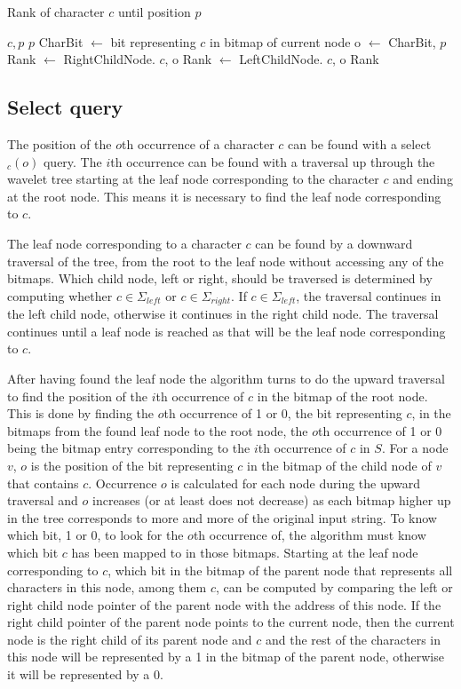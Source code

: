 \begin{algorithm}
\caption{Rank of character $c$ until position $p$}
\label{alg:rank}
\begin{algorithmic} 
 {$c, p$}
\State \Return $p$
\EndIf
\State CharBit $\gets$ bit representing $c$ in bitmap of current node
\State o $\gets$  {CharBit, $p$}
	\State Rank $\gets$ RightChildNode. {$c$, o}
\Else
	\State Rank $\gets$ LeftChildNode. {$c$, o}
\EndIf
\State \Return Rank
\EndFunction
\end{algorithmic}
\end{algorithm}


\subsection{Select query}
\label{sec:selectDescription}
The position of the $o$th occurrence of a character $c$ can be found with a select$_c(o)$ query.
The $i$th occurrence can be found with a traversal up through the wavelet tree starting at the leaf node corresponding to the character $c$ and ending at the root node.
This means it is necessary to find the leaf node corresponding to $c$.

The leaf node corresponding to a character $c$ can be found by a downward traversal of the tree, from the root to the leaf node without accessing any of the bitmaps.
Which child node, left or right, should be traversed is determined by computing whether $c \in \Sigma_{\mathit{left}}$ or $c \in \Sigma_{\mathit{right}}$.
If $c \in \Sigma_{\mathit{left}}$, the traversal continues in the left child node, otherwise it continues in the right child node.
The traversal continues until a leaf node is reached as that will be the leaf node corresponding to $c$.

After having found the leaf node the algorithm turns to do the upward traversal to find the position of the $i$th occurrence of $c$ in the bitmap of the root node.
This is done by finding the $o$th occurrence of 1 or 0, the bit representing $c$, in the bitmaps from the found leaf node to the root node, the $o$th occurrence of 1 or 0 being the bitmap entry corresponding to the $i$th occurrence of $c$ in $S$.
For a node $v$, $o$ is the position of the bit representing $c$ in the bitmap of the child node of $v$ that contains $c$.
Occurrence $o$ is calculated for each node during the upward traversal and $o$ increases (or at least does not decrease) as each bitmap higher up in the tree corresponds to more and more of the original input string.
To know which bit, 1 or 0, to look for the $o$th occurrence of, the algorithm must know which bit $c$ has been mapped to in those bitmaps.
Starting at the leaf node corresponding to $c$,  which bit in the bitmap of the parent node that represents all characters in this node, among them $c$, can be computed by comparing the left or right child node pointer of the parent node with the address of this node.
If the right child pointer of the parent node points to the current node, then the current node is the right child of its parent node and $c$ and the rest of the characters in this node will be represented by a 1 in the bitmap of the parent node, otherwise it will be represented by a 0.

